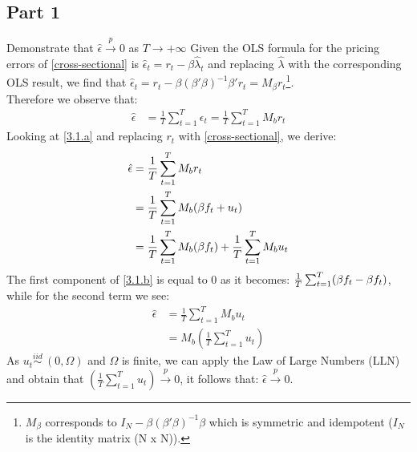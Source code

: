 \documentclass[12pt]{article}
\begin{document}
	\subsection{Part 1 }
	Demonstrate that $\hat{\epsilon} \overset{p}{\to} 0$ as $T\to{+\infty}$
	Given the OLS formula for the pricing errors of \ref{cross-sectional} is $\hat{\epsilon}_t = r_t - \beta\hat{\lambda}_t$ and replacing $\hat{\lambda}$ with the corresponding OLS result, we find that $\hat{\epsilon}_t = r_t - \beta(\beta'\beta)^{-1}\beta'r_t = M_{\beta}r_t$\footnote{$M_{\beta}$ corresponds to $I_N - \beta(\beta'\beta)^{-1}\beta$ which is symmetric and idempotent ($I_N$ is the identity matrix (N x N)).}.\\
	Therefore we observe that:
	\begin{align} \label{3.1.a}
				\hat{\epsilon} &= \frac{1}{T}\sum_{t=1}^{T}\epsilon_t = \frac{1}{T}\sum_{t=1}^{T}M_br_t
	\end{align}
	Looking at \ref{3.1.a} and replacing $r_t$ with \ref{cross-sectional}, we derive:
\begin{align} \label{3.1.b}
				\hat{\epsilon} &=\frac{1}{T}\sum_{t=1}^{T}M_br_t \notag \\ \notag
				&= \frac{1}{T}\sum_{t=1}^{T}M_b(\MakeUppercase\beta f_t + u_t) \\ 
				&= \frac{1}{T}\sum_{t=1}^{T}M_b(\MakeUppercase\beta f_t) + \frac{1}{T}\sum_{t=1}^{T}M_bu_t
\end{align}
The first component of \ref{3.1.b} is equal to 0 as it becomes: $\frac{1}{T}\sum_{t=1}^{T}(\MakeUppercase\beta f_t-\MakeUppercase\beta f_t)$, while for the second term we see:
\begin{align*} 
				\hat{\epsilon} &=\frac{1}{T}\sum_{t=1}^{T}M_bu_t \\
				&= M_b(\frac{1}{T}\sum_{t=1}^{T}u_t)
\end{align*}
As $u_t \overset{iid}{\sim} \: (0,\Omega)$ and $\Omega$ is finite, we can apply the Law of Large Numbers (LLN) and obtain that $(\frac{1}{T}\sum_{t=1}^{T}u_t) \overset{p}{\to} 0$, it follows that: $\hat{\epsilon} \overset{p}{\to} 0$.
\end{document}
